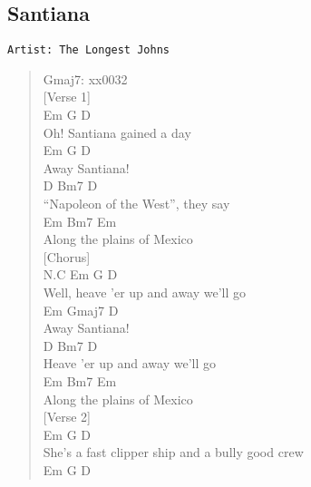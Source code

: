 \documentclass[11pt]{article}
\begin{document}
\subsection{Santiana}
\label{sec:org1887408}
\begin{verbatim}
Artist: The Longest Johns
\end{verbatim}
\begin{verse}
Gmaj7: xx0032\\
\vspace*{1em}
[Verse 1]\\
\vspace*{1em}
\hspace*{4em}Em       G        D\\
Oh! Santiana gained a day\\
\hspace*{1em}Em       G D\\
Away Santiana!\\
\hspace*{3em}D             Bm7         D\\
``Napoleon of the West'', they say\\
\hspace*{2em}Em      Bm7       Em\\
Along the plains of Mexico\\
\vspace*{1em}
\vspace*{1em}
[Chorus]\\
N.C Em                  G         D\\
Well, heave 'er up and away we'll go\\
\hspace*{1em}Em     Gmaj7 D\\
Away Santiana!\\
D                  Bm7        D\\
\hspace*{1em}Heave 'er up and away we'll go\\
\hspace*{1em}Em       Bm7       Em\\
Along the plains of Mexico\\
\vspace*{1em}
\vspace*{1em}
[Verse 2]\\
\hspace*{8em}Em                      G          D\\
She's a fast clipper ship and a bully good crew\\
\hspace*{1em}Em       G D\\

\end{verse}
\end{document}
